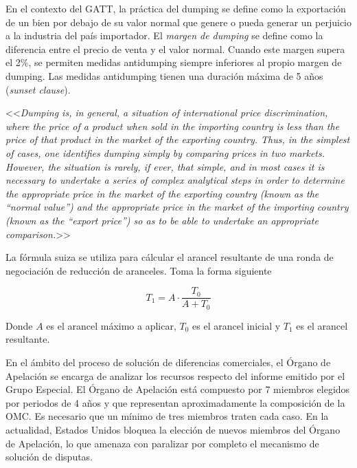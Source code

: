 \documentclass{nuevotema}
\begin{document}

En el contexto del GATT, la práctica del dumping se define como la exportación de un bien por debajo de su valor normal que genere o pueda generar un perjuicio a la industria del país importador. El \textit{margen de dumping} se define como la diferencia entre el precio de venta y el valor normal. Cuando este margen supera el 2\%, se permiten medidas antidumping siempre inferiores al propio margen de dumping. Las medidas antidumping tienen una duración máxima de 5 años (\textit{sunset clause}).

<<\textit{Dumping is, in general, a situation of international price discrimination, where the price of a product when sold in the importing country is less than the price of that product in the market of the exporting country. Thus, in the simplest of cases, one identifies dumping simply by comparing prices in two markets. However, the situation is rarely, if ever, that simple, and in most cases it is necessary to undertake a series of complex analytical steps in order to determine the appropriate price in the market of the exporting country (known as the “normal value”) and the appropriate price in the market of the importing country (known as the “export price”) so as to be able to undertake an appropriate comparison.}>>



La fórmula suiza se utiliza para cálcular el arancel resultante de una ronda de negociación de reducción de aranceles. Toma la forma siguiente

\begin{equation}
T_1 =  A \cdot \frac{T_0}{A + T_0}
\end{equation}

Donde $A$ es el arancel máximo a aplicar, $T_0$ es el arancel inicial y $T_1$ es el arancel resultante.



En el ámbito del proceso de solución de diferencias comerciales, el Órgano de Apelación se encarga de analizar los recursos respecto del informe emitido por el Grupo Especial. El Órgano de Apelación está compuesto por 7 miembros elegidos por periodos de 4 años y que representan aproximadamente la composición de la OMC. Es necesario que un mínimo de tres miembros traten cada caso. En la actualidad, Estados Unidos bloquea la elección de nuevos miembros del Órgano de Apelación, lo que amenaza con paralizar por completo el mecanismo de solución de disputas.
\end{document}
